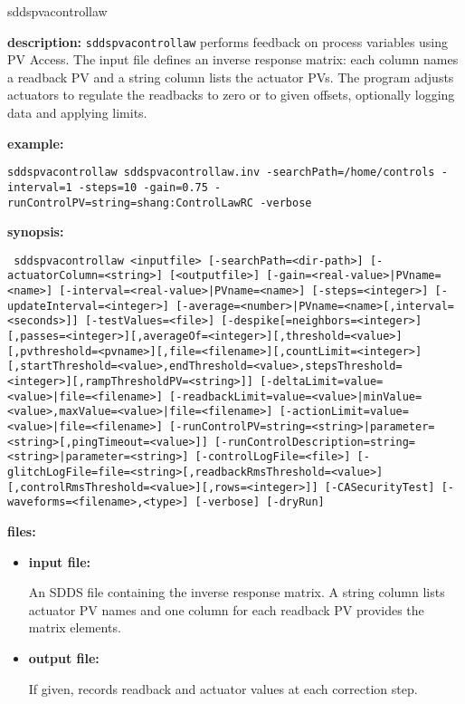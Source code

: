 %
%
\begin{sddsprog}{sddspvacontrollaw}
\item {\bf description:}
\verb+sddspvacontrollaw+ performs feedback on process variables using PV Access. The
input file defines an inverse response matrix: each column names a readback PV and a
string column lists the actuator PVs. The program adjusts actuators to regulate the
readbacks to zero or to given offsets, optionally logging data and applying limits.

\item {\bf example:}
\begin{flushleft}{\tt sddspvacontrollaw sddspvacontrollaw.inv -searchPath=/home/controls -interval=1 -steps=10 -gain=0.75 -runControlPV=string=shang:ControlLawRC -verbose}\end{flushleft}

\item {\bf synopsis:}
\begin{flushleft}{\tt
sddspvacontrollaw <inputfile> [-searchPath=<dir-path>] [-actuatorColumn=<string>] [<outputfile>]\
[-gain={<real-value>|PVname=<name>}] [-interval={<real-value>|PVname=<name>}] [-steps=<integer>]\
[-updateInterval=<integer>] [-average={<number>|PVname=<name>}[,interval=<seconds>]]\
[-testValues=<file>]\
[-despike[=neighbors=<integer>][,passes=<integer>][,averageOf=<integer>][,threshold=<value>][,pvthreshold=<pvname>][,file=<filename>][,countLimit=<integer>][,startThreshold=<value>,endThreshold=<value>,stepsThreshold=<integer>][,rampThresholdPV=<string>]]\
[-deltaLimit={value=<value>|file=<filename>}]\
[-readbackLimit={value=<value>|minValue=<value>,maxValue=<value>|file=<filename>}]\
[-actionLimit={value=<value>|file=<filename>}]\
[-runControlPV={string=<string>|parameter=<string>}[,pingTimeout=<value>]]\
[-runControlDescription={string=<string>|parameter=<string>}] [-controlLogFile=<file>]\
[-glitchLogFile=file=<string>[,readbackRmsThreshold=<value>][,controlRmsThreshold=<value>][,rows=<integer>]]\
[-CASecurityTest] [-waveforms=<filename>,<type>] [-verbose] [-dryRun]}
\end{flushleft}

\item {\bf files:}
  \begin{itemize}
  \item {\bf input file:} \par
    An SDDS file containing the inverse response matrix. A string column lists actuator PV names and one column for each readback PV provides the matrix elements.
  \item {\bf output file:} \par
    If given, records readback and actuator values at each correction step.
  \end{itemize}


\end{sddsprog}
